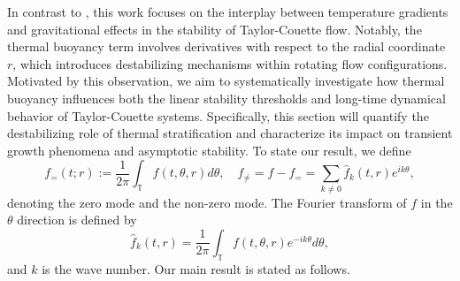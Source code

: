 \documentclass[final, 12pt,reqno]{amsart}
\numberwithin{equation}{section}
\begin{document}
In contrast to \cite{An.2024}, this work focuses on the interplay between temperature gradients and gravitational effects in the stability of Taylor-Couette flow. Notably, the thermal buoyancy term involves derivatives with respect to the radial coordinate $r$, which introduces destabilizing mechanisms within rotating flow configurations. Motivated by this observation, we aim to systematically investigate how thermal buoyancy influences both the linear stability thresholds and long-time dynamical behavior of Taylor-Couette systems. Specifically, this section will quantify the destabilizing role of thermal stratification and characterize its impact on transient growth phenomena and asymptotic stability. To state our result, we define
$${f}_=(t;r):=\dfrac{1}{2\pi}\int_{\mathbb{T}}f(t,\theta,r)d\theta,\quad f_{\neq}=f-{f}_==\sum_{k\neq 0}\hat{f}_k(t,r)e^{ik\theta},$$
denoting
the zero mode and the non-zero mode.
The Fourier transform of $f$ in the $\theta$ direction is defined by
$$\hat{f}_k(t,r)=\dfrac{1}{2\pi}\int_{\mathbb{T}}f(t,\theta,r)e^{-ik\theta}d\theta,$$
and $k$ is the wave number.
  Our main result is stated as follows.
\end{document}
